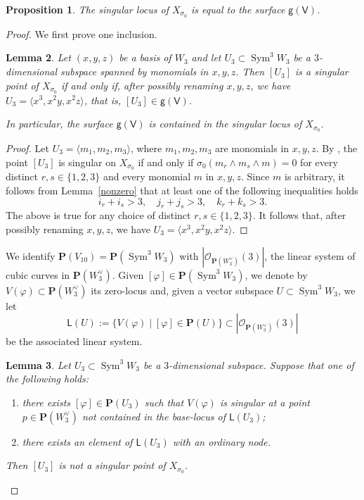 \documentclass[11pt]{article}
\let\mathcal\mathscr
\newenvironment{enumeratea}
{\bgroup\def\theenumi{\alph{enumi}}\def\theenumii{\arabic{enumii}}\begin{enumerate}}
{\end{enumerate}\egroup}
\newtheorem{lemm}{Lemma}[section]
\newtheorem{prop}[lemm]{Proposition}
\theoremstyle{definition}
\renewcommand\P{{\mathbf P}}\let\PP\P
\newcommand\cO{\mathcal{O}}\let\OO\cO
\newcommand\sfg{\mathsf{g}}
\newcommand\sfL{\mathsf{L}}
\newcommand\sfV{\mathsf{V}}
\newcommand\gv{\sfg(\sfV)}
\let\phi\varphi
\let\la\langle
\let\ra\rangle
\DeclareMathOperator{\Sym}{Sym}
\begin{document}
\begin{prop}\label{singeffe}
The singular locus of $X_{\sigma_0}$ is equal to the surface $\gv$.
\end{prop}

\begin{proof}
We first prove one inclusion.

\begin{lemm}\label{monsing}
Let $(x,y,z)$ be a basis of $W_{3}$ and let $U_3\subset \Sym^3 \!W_3$ be a $3$-dimensional subspace spanned by monomials in $x,y,z$. Then $[U_3]$ is a singular point of $X_{\sigma_0}$ if and only if, after possibly renaming $x, y, z$, we have $U_3\!=\!\la x^3,x^2y,x^2z\ra$, that is, \hbox{$[ U_3]\!\in\!\gv$}.

In particular, the surface $\gv$ is contained in the singular locus of $X_{\sigma_0}$.
\end{lemm}

\begin{proof}
Let $U_3=\la m_1,m_2,m_3\ra$, where $m_1,m_2,m_3$ are monomials in $x,y,z$. By \cite[Prop.\,3.1]{devo}, the point $[U_3]$
is singular on $X_{\sigma_0}$ if and only if ${\sigma_0}(m_r\wedge m_s\wedge m)=0$ for every distinct $r,s\in\{1,2,3\}$ and every monomial $m$ in $x,y,z$. Since $m$ is arbitrary, it follows from Lemma~\ref{nonzero} that at least one of the
following inequalities holds
\[
i_r+i_s>3,\quad j_r+j_s>3,\quad k_r+k_s>3.
\]
The above is true for any choice of distinct $r,s\in\{1,2,3\}$. It follows that, after possibly renaming $x,y,z$, we have $U_3=\la x^3,x^2y,x^2z\ra$.
\end{proof}

We identify $\P(V_{10})=\P(\Sym^3\! W_3)$ with $|\cO_{\P(W_3^{\vee})}(3)|$, the linear system of cubic curves in $\PP(W^{\vee}_3)$. Given $[\phi]\in \PP(\Sym^3\! W_3)$, we denote by $V(\phi)\subset \P(W_3^{\vee})$ its zero-locus
and, given
a vector subspace $U\subset \Sym^3 \!W_3$, we let
\begin{equation}\label{sistlin}
\sfL(U):=\{V(\phi) \mid [\phi]\in\PP(U)\}\subset |\cO_{\P(W_3^{\vee})}(3)|
\end{equation}
be the associated linear system.

\begin{lemm}\label{primopasso}
Let $U_3\subset \Sym^3 \!W_3$ be a $3$-dimensional subspace. Suppose that one of the following holds:
\begin{enumeratea}
\item\label{primopassoa}
there exists $[\phi]\in \PP(U_3)$ such that $V(\phi)$ is singular at a point $p\in \P(W_3^{\vee})$ not contained in the base-locus of $\sfL(U_3)$;
\item\label{primopassob}
there exists an element of $\sfL(U_3)$ with an ordinary node.
\end{enumeratea}
\noindent
Then $[U_3]$ is not a singular point of $X_{\sigma_0}$.
\end{lemm}


\end{proof}
\end{document}
